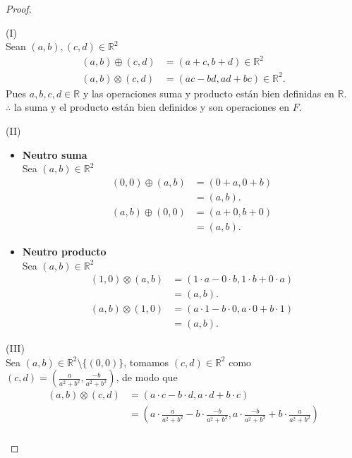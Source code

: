 \documentclass[11pt,letterpaper]{article}
\newcommand{\R}{\mathbb{R}}
\begin{document}
\begin{proof}\,\\
\begin{tcolorbox}[title=Demostración, colframe=G, coltitle=B, fonttitle=\bfseries]
	(I)\\
	Sean $(a,b),(c,d)\in\R^2$
	\begin{align*}
		(a,b)\oplus(c,d)&=(a+c,b+d)\in\R^2\\
		(a,b)\otimes(c,d)&=(ac-bd,ad+bc)\in\R^2.
	\end{align*}
	Pues $a,b,c,d\in\R$ y las operaciones suma y producto están bien definidas en $\R$.\\
	$\therefore$ la suma y el producto están bien definidos y son operaciones en $F$.
\end{tcolorbox}
\begin{tcolorbox}
	(II)\\
	\begin{itemize}
		\item \textbf{Neutro suma}\\
		Sea $(a,b)\in\R^2$
		\begin{align*}
			(0,0)\oplus(a,b)&=(0+a,0+b)\\
			&=(a,b).
		\end{align*}
		\begin{align*}
			(a,b)\oplus(0,0)&=(a+0,b+0)\\
			&=(a,b).
		\end{align*}
		\item \textbf{Neutro producto}\\
		Sea $(a,b)\in\R^2$
		\begin{align*}
			(1,0)\otimes(a,b)&=(1\cdot a-0\cdot b,1\cdot b+0\cdot a)\\
			&=(a,b).
		\end{align*}
		\begin{align*}
			(a,b)\otimes(1,0)&=(a\cdot 1-b\cdot 0,a\cdot 0+b\cdot 1)\\
			&=(a,b).
		\end{align*}
	\end{itemize}
\end{tcolorbox}
\begin{tcolorbox}
	(III)\\
	Sea $(a,b)\in\R^2\setminus\{(0,0)\}$, tomamos $(c,d)\in\R^2$ como $(c,d)=\left(\frac{a}{a^2+b^2},\frac{-b}{a^2+b^2}\right)$, de modo que
	\begin{align*}
		(a,b)\otimes(c,d)&=(a\cdot c-b\cdot d,a\cdot d+b\cdot c)\\
		&=(a\cdot\frac{a}{a^2+b^2}-b\cdot\frac{-b}{a^2+b^2},a\cdot\frac{-b}{a^2+b^2}+b\cdot\frac{a}{a^2+b^2})\\

\end{align*}
\end{tcolorbox}
\end{proof}
\end{document}
